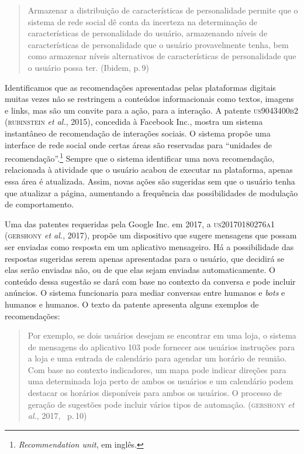 \begin{quote}
Armazenar a distribuição de características de personalidade permite que
o sistema de rede social dê conta da incerteza na determinação de
características de personalidade do usuário, armazenando níveis de
características de personalidade que o usuário provavelmente tenha, bem
como armazenar níveis alternativos de características de personalidade
que o usuário possa ter. (Ibidem, p.\,9)
\end{quote}

Identificamos que as recomendações apresentadas pelas plataformas
digitais muitas vezes não se restringem a conteúdos informacionais como
textos, imagens e links, mas são um convite para a ação, para a
interação. A patente \textsc{us9043400b2} (\textsc{rubinstein} \textit{et al.}, 2015),
concedida à Facebook Inc., mostra um sistema instantâneo de recomendação
de interações sociais. O sistema propõe uma interface de rede social
onde certas áreas são reservadas para ``unidades de
recomendação''.\footnote{\textit{Recommendation unit}, em inglês.} Sempre que o
sistema identificar uma nova recomendação, relacionada à atividade que o
usuário acabou de executar na plataforma, apenas essa área é atualizada.
Assim, novas ações são sugeridas sem que o usuário tenha que atualizar a
página, aumentando a frequência das possibilidades de modulação de
comportamento.

Uma das patentes requeridas pela Google Inc. em 2017, a \textsc{us20170180276a1}
(\textsc{gershony} \textit{et al.}, 2017), propõe um dispositivo que sugere
mensagens que possam ser enviadas como resposta em um aplicativo
mensageiro. Há a possibilidade das respostas sugeridas serem apenas
apresentadas para o usuário, que decidirá se elas serão enviadas não, ou
de que elas sejam enviadas automaticamente. O conteúdo dessa sugestão se
dará com base no contexto da conversa e pode incluir anúncios. O sistema
funcionaria para mediar conversas entre humanos e \textit{bots} e humanos
e humanos. O texto da patente apresenta alguns exemplos de
recomendações:

\begin{quote}
Por exemplo, se dois usuários desejam se encontrar em uma loja, o sistema de mensagens
do aplicativo 103 pode fornecer aos usuários instruções para a loja e
uma entrada de calendário para agendar um horário de reunião. Com base no contexto
indicadores, um mapa pode indicar direções para uma determinada loja perto de
ambos os usuários e um calendário podem destacar os horários disponíveis
para ambos os usuários. O processo de geração de sugestões pode incluir
vários tipos de automação. (\textsc{gershony} \textit{et al.}, 2017,~ p.\,10)
\end{quote}

